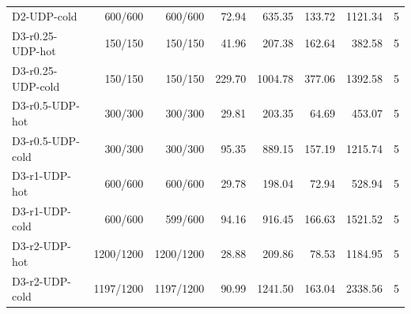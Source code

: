 \begin{table}[t]
\begin{tabularx}{\textwidth}{@{}Xr r r r r r r@{}}
D2-UDP-cold & 600/600 & 600/600 & 72.94 & 635.35 & 133.72 & 1121.34 & 5 \\
D3-r0.25-UDP-hot & 150/150 & 150/150 & 41.96 & 207.38 & 162.64 & 382.58 & 5 \\
D3-r0.25-UDP-cold & 150/150 & 150/150 & 229.70 & 1004.78 & 377.06 & 1392.58 & 5 \\
D3-r0.5-UDP-hot & 300/300 & 300/300 & 29.81 & 203.35 & 64.69 & 453.07 & 5 \\
D3-r0.5-UDP-cold & 300/300 & 300/300 & 95.35 & 889.15 & 157.19 & 1215.74 & 5 \\
D3-r1-UDP-hot & 600/600 & 600/600 & 29.78 & 198.04 & 72.94 & 528.94 & 5 \\
D3-r1-UDP-cold & 600/600 & 599/600 & 94.16 & 916.45 & 166.63 & 1521.52 & 5 \\
D3-r2-UDP-hot & 1200/1200 & 1200/1200 & 28.88 & 209.86 & 78.53 & 1184.95 & 5 \\
D3-r2-UDP-cold & 1197/1200 & 1197/1200 & 90.99 & 1241.50 & 163.04 & 2338.56 & 5 \\
\bottomrule
\end{tabularx}
\end{table}
